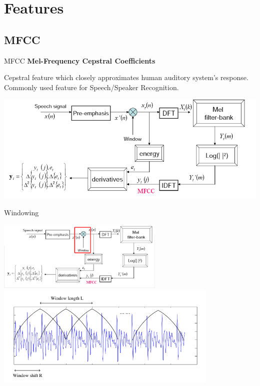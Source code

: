 

\section{Features}
\subsection{MFCC}
\begin{frame}[label=mfcc]{MFCC}
  \textbf{Mel-Frequency Cepstral Coefficients}

  Cepstral feature which closely approximates human auditory system's response.
  Commonly used feature for Speech/Speaker Recognition.
\begin{center}
  \includegraphics[width=\textwidth]{res/MFCC.png}
\end{center}
\end{frame}

\begin{frame}{Windowing}
\begin{center}
  \includegraphics[width=0.6\textwidth]{res/MFCC-windowing.png}\\
  \includegraphics[width=0.8\textwidth]{res/MFCC-windowing-frames.png}
\end{center}
\end{frame}

